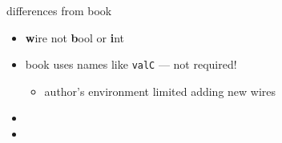 \begin{frame}{differences from book}
    \begin{itemize}
    \item {\textbf wire} not {\textbf bool} or {\textbf int}
    \item book uses names like {\tt valC} --- not required!
        \begin{itemize}
        \item author's environment limited adding new wires
        \end{itemize}
    \item {}
    \item {}
    \end{itemize}
\end{frame}

